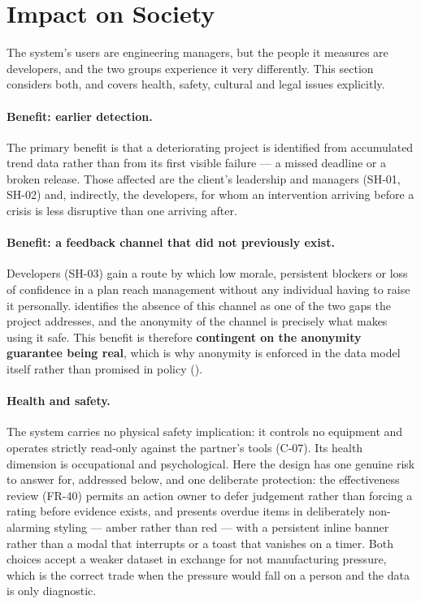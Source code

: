 \section{Impact on Society}
\label{sec:society}

The system's users are engineering managers, but the people it measures are
developers, and the two groups experience it very differently. This section
considers both, and covers health, safety, cultural and legal issues explicitly.

\paragraph{Benefit: earlier detection.} The primary benefit is that a
deteriorating project is identified from accumulated trend data rather than from
its first visible failure --- a missed deadline or a broken release. Those
affected are the client's leadership and managers (SH-01, SH-02) and,
indirectly, the developers, for whom an intervention arriving before a crisis is
less disruptive than one arriving after.

\paragraph{Benefit: a feedback channel that did not previously exist.}
Developers (SH-03) gain a route by which low morale, persistent blockers or loss
of confidence in a plan reach management without any individual having to raise
it personally.  identifies the absence of this channel as one
of the two gaps the project addresses, and the anonymity of the channel is
precisely what makes using it safe. This benefit is therefore \textbf{contingent
on the anonymity guarantee being real}, which is why anonymity is enforced in
the data model itself rather than promised in policy ().

\paragraph{Health and safety.} The system carries no physical safety
implication: it controls no equipment and operates strictly read-only against
the partner's tools (C-07). Its health dimension is occupational and
psychological. Here the design has one genuine risk to answer for, addressed
below, and one deliberate protection: the effectiveness review (FR-40) permits
an action owner to defer judgement rather than forcing a rating before evidence
exists, and presents overdue items in deliberately non-alarming styling ---
amber rather than red --- with a persistent inline banner rather than a modal
that interrupts or a toast that vanishes on a timer. Both choices accept a
weaker dataset in exchange for not manufacturing pressure, which is the correct
trade when the pressure would fall on a person and the data is only diagnostic.

